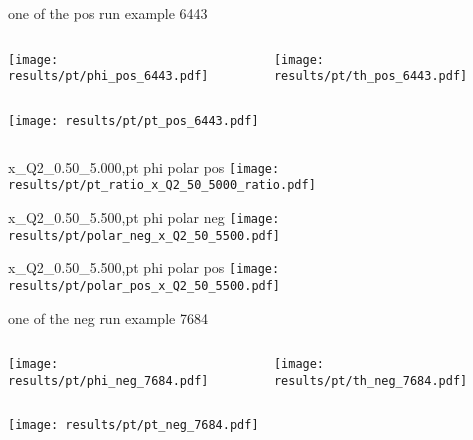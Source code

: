 \begin{frame}{one of the pos run example 6443}
\begin{columns}
\begin{column}[T]{0.5\textwidth}
\texttt{[image: results/pt/phi\_pos\_6443.pdf]}
\end{column}
\begin{column}[T]{0.5\textwidth}
\texttt{[image: results/pt/th\_pos\_6443.pdf]}
\end{column}
\end{columns}
\begin{columns}
\begin{column}[T]{0.5\textwidth}
\texttt{[image: results/pt/pt\_pos\_6443.pdf]}
\end{column}
\begin{column}[T]{0.5\textwidth}
\end{column}
\end{columns}
\end{frame}
\begin{frame}{x\_Q2\_0.50\_5.000,pt phi polar pos}
\texttt{[image: results/pt/pt\_ratio\_x\_Q2\_50\_5000\_ratio.pdf]}
\end{frame}
\begin{frame}{x\_Q2\_0.50\_5.500,pt phi polar neg}
\texttt{[image: results/pt/polar\_neg\_x\_Q2\_50\_5500.pdf]}
\end{frame}
\begin{frame}{x\_Q2\_0.50\_5.500,pt phi polar pos}
\texttt{[image: results/pt/polar\_pos\_x\_Q2\_50\_5500.pdf]}
\end{frame}
\begin{frame}{one of the neg run example 7684}
\begin{columns}
\begin{column}[T]{0.5\textwidth}
\texttt{[image: results/pt/phi\_neg\_7684.pdf]}
\end{column}
\begin{column}[T]{0.5\textwidth}
\texttt{[image: results/pt/th\_neg\_7684.pdf]}
\end{column}
\end{columns}
\texttt{[image: results/pt/pt\_neg\_7684.pdf]}
\end{frame}
